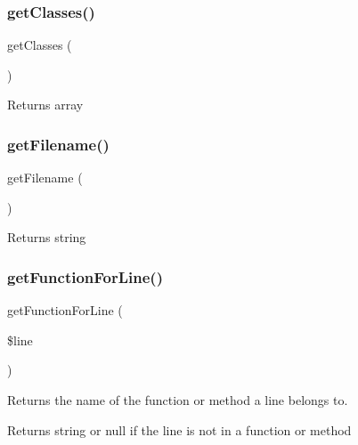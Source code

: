 \subsubsection{\texorpdfstring{get\+Classes()}{getClasses()}}
{\footnotesize\ttfamily get\+Classes (\begin{DoxyParamCaption}{ }\end{DoxyParamCaption})}

\begin{DoxyReturn}{Returns}
array 
\end{DoxyReturn}
\mbox{\label{class_p_h_p___token___stream_a2982abe8d7b767602a1485dfb4cf653d}} 
\subsubsection{\texorpdfstring{get\+Filename()}{getFilename()}}
{\footnotesize\ttfamily get\+Filename (\begin{DoxyParamCaption}{ }\end{DoxyParamCaption})}

\begin{DoxyReturn}{Returns}
string 
\end{DoxyReturn}
\mbox{\label{class_p_h_p___token___stream_ac6b487ff48b29eab308aac9ab0f7ac0f}} 
\subsubsection{\texorpdfstring{get\+Function\+For\+Line()}{getFunctionForLine()}}
{\footnotesize\ttfamily get\+Function\+For\+Line (\begin{DoxyParamCaption}\item[{}]{\$line }\end{DoxyParamCaption})}

Returns the name of the function or method a line belongs to.

\begin{DoxyReturn}{Returns}
string or null if the line is not in a function or method 
\end{DoxyReturn}
\mbox{\label{class_p_h_p___token___stream_a131c2522f07821f77cd1d038c216031b}} 

